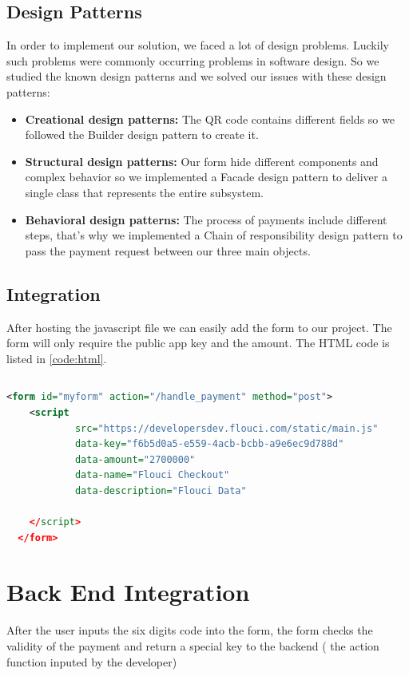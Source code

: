 \begin{spacing}{1.2}
\subsection{Design Patterns}
In order to implement our solution, we faced a lot of design problems. Luckily such problems were commonly occurring problems in software design. So we studied the known design patterns\cite{designpattern} and we solved our issues with these design patterns:
\begin{itemize}
	\item \textbf{Creational design patterns\cite{designpattern}:} The QR code contains different fields so we followed the Builder design pattern to create it.
	\item \textbf{Structural design patterns\cite{designpattern}:} Our form hide different components and complex behavior so we implemented a Facade design pattern to deliver a single class that 
	 represents the entire subsystem.
	 \item \textbf{Behavioral design patterns\cite{designpattern}:} The process of payments include different steps, that's why we implemented a  Chain of responsibility design pattern to pass the payment request between our three main objects.
\end{itemize}
\subsection{Integration}
After hosting the javascript file we can easily add the form to our project. The form will only require the public app key  and the amount.
The HTML code is listed in \ref{code:html}.
\begin{lstlisting}[rulecolor=\color{white}]
\end{lstlisting}
\begin{lstlisting}[label=code:html,caption=Flouci Integration Java,language=xml]
 <form id="myform" action="/handle_payment" method="post">
    <script
            src="https://developersdev.flouci.com/static/main.js"
            data-key="f6b5d0a5-e559-4acb-bcbb-a9e6ec9d788d"
            data-amount="2700000"
            data-name="Flouci Checkout"
            data-description="Flouci Data"

    </script>
  </form>
\end{lstlisting}


\section{Back End Integration}
After the user inputs the six digits code into the form, the form checks the validity of the payment and return a special key to the backend ( the action function inputed by the developer)


\end{spacing}
